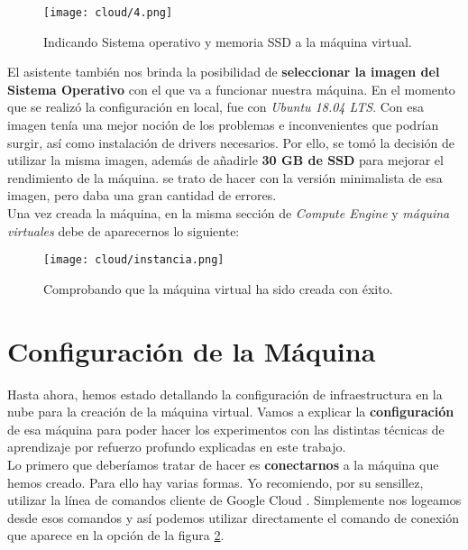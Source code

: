 \documentclass[11pt,fleqn]{book} %
\begin{document}
\begin{figure}[H]
	\centering\texttt{[image: cloud/4.png]}
	\caption{Indicando Sistema operativo y memoria SSD a la máquina virtual.}
	\label{fig:cloud4} %
\end{figure} 

El asistente también nos brinda la posibilidad de \textbf{seleccionar la imagen del Sistema Operativo} con el que va a funcionar nuestra máquina. En el momento que se realizó la configuración en local, fue con \textit{Ubuntu 18.04 LTS}. Con esa imagen tenía una mejor noción de los problemas e inconvenientes que podrían surgir, así como instalación de drivers necesarios. Por ello, se tomó la decisión de utilizar la misma imagen, además de añadirle \textbf{30 GB de SSD} para mejorar el rendimiento de la máquina. se trato de hacer con la versión minimalista de esa imagen, pero daba una gran cantidad de errores. \\

Una vez creada la máquina, en la misma sección de \textit{Compute Engine} y \textit{máquina virtuales} debe de aparecernos lo siguiente:

\begin{figure}[H]
	\centering\texttt{[image: cloud/instancia.png]}
	\caption{Comprobando que la máquina virtual ha sido creada con éxito.}
	\label{fig:cloudinstancia} %
\end{figure} 

\section{Configuración de la Máquina}\label{sec:configuracionmaquina}

Hasta ahora, hemos estado detallando la configuración de infraestructura en la nube para la creación de la máquina virtual. Vamos a explicar la \textbf{configuración} de esa máquina para poder hacer los experimentos con las distintas técnicas de aprendizaje por refuerzo profundo explicadas en este trabajo. \\

Lo primero que deberíamos tratar de hacer es \textbf{conectarnos} a la máquina que hemos creado. Para ello hay varias formas. Yo recomiendo, por su sensillez, utilizar la línea de comandos cliente de Google Cloud \cite{article:gcloud}. Simplemente nos logeamos desde esos comandos y así podemos utilizar directamente el comando de conexión que aparece en la opción de la figura \ref{fig:cloudinstancia}. \\
\end{document}
